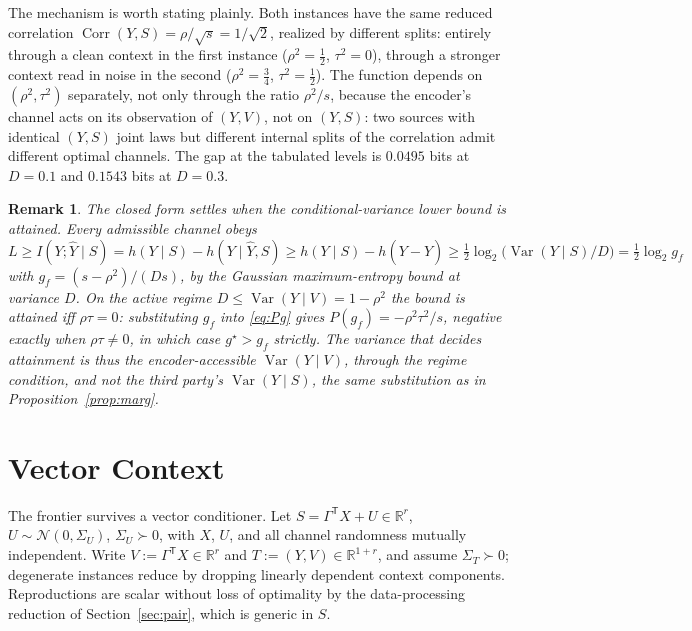 \documentclass[11pt,onecolumn]{IEEEtran}
\newtheorem{remark}[theorem]{Remark}
\newcommand{\R}{\mathbb{R}}
\newcommand{\hY}{\widehat{Y}}
\begin{document}
The mechanism is worth stating plainly. Both instances have the same
reduced correlation $\operatorname{Corr}(Y,S)=\rho/\sqrt{s}=1/\sqrt2$,
realized by different splits: entirely through a clean context in the
first instance ($\rho^2=\tfrac12$, $\tau^2=0$), through a stronger
context read in noise in the second ($\rho^2=\tfrac34$,
$\tau^2=\tfrac12$). The function depends on $(\rho^2,\tau^2)$
separately, not only through the ratio $\rho^2/s$, because the
encoder's channel acts on its observation of $(Y,V)$, not on $(Y,S)$:
two sources with identical $(Y,S)$ joint laws but different internal
splits of the correlation admit different optimal channels.
The gap at the tabulated levels is $0.0495$ bits at $D=0.1$ and
$0.1543$ bits at $D=0.3$.

\begin{remark}\label{rem:floor}
The closed form settles when the conditional-variance lower bound is
attained. Every admissible channel obeys
$L\ge I(Y;\hY\mid S)=h(Y\mid S)-h(Y\mid\hY,S)\ge h(Y\mid S)-h(Y-\hY)
\ge\tfrac12\log_2\bigl(\operatorname{Var}(Y\mid S)/D\bigr)
=\tfrac12\log_2 g_f$ with $g_f=(s-\rho^2)/(Ds)$, by the Gaussian
maximum-entropy bound at variance $D$. On the active regime
$D\le\operatorname{Var}(Y\mid V)=1-\rho^2$ the bound is attained iff
$\rho\tau=0$: substituting $g_f$ into \eqref{eq:Pg} gives
$P(g_f)=-\rho^2\tau^2/s$, negative exactly when $\rho\tau\ne0$, in which
case $g^\star>g_f$ strictly. The variance that decides attainment is
thus the encoder-accessible $\operatorname{Var}(Y\mid V)$, through the
regime condition, and not the third party's $\operatorname{Var}(Y\mid S)$,
the same substitution as in Proposition~\ref{prop:marg}.
\end{remark}

\section{Vector Context}
\label{sec:vector}

The frontier survives a vector conditioner. Let
$S=\Gamma^{\mathsf T}X+U\in\R^r$, $U\sim\mathcal N(0,\Sigma_U)$,
$\Sigma_U\succ0$, with $X$, $U$, and all channel randomness mutually
independent. Write $V:=\Gamma^{\mathsf T}X\in\R^r$ and
$T:=(Y,V)\in\R^{1+r}$, and assume $\Sigma_T\succ0$; degenerate
instances reduce by dropping linearly dependent context components.
Reproductions are scalar without loss of optimality by the
data-processing reduction of Section~\ref{sec:pair}, which is generic
in $S$.
\end{document}
